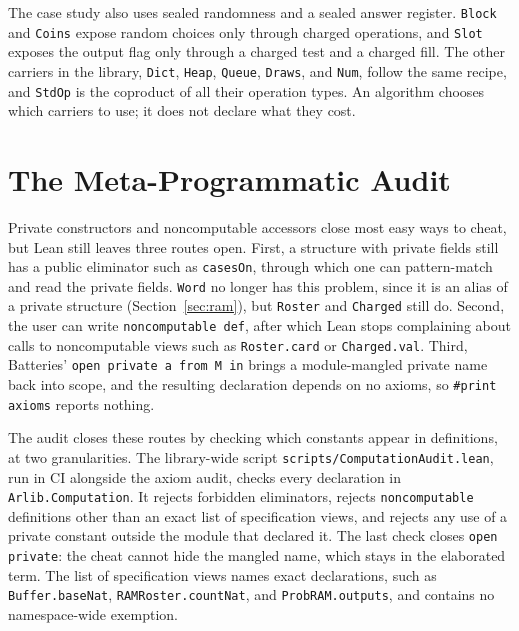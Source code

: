 \documentclass[acmsmall,nonacm]{acmart}
\begin{document}
The case study also uses sealed randomness and a sealed answer register.
\lstinline{Block} and \lstinline{Coins} expose random choices only through charged operations, and \lstinline{Slot} exposes the output flag only through a charged test and a charged fill.
The other carriers in the library, \lstinline{Dict}, \lstinline{Heap}, \lstinline{Queue}, \lstinline{Draws}, and \lstinline{Num}, follow the same recipe, and \lstinline{StdOp} is the coproduct of all their operation types.
An algorithm chooses which carriers to use; it does not declare what they cost.


\section{The Meta-Programmatic Audit}\label{sec:audit}

Private constructors and noncomputable accessors close most easy ways to cheat, but Lean still leaves three routes open.
First, a structure with private fields still has a public eliminator such as \lstinline{casesOn}, through which one can pattern-match and read the private fields.
\lstinline{Word} no longer has this problem, since it is an alias of a private structure (Section~\ref{sec:ram}), but \lstinline{Roster} and \lstinline{Charged} still do.
Second, the user can write \lstinline{noncomputable def}, after which Lean stops complaining about calls to noncomputable views such as \lstinline{Roster.card} or \lstinline{Charged.val}.
Third, Batteries' \lstinline{open private a from M in} brings a module-mangled private name back into scope, and the resulting declaration depends on no axioms, so \lstinline{#print axioms} reports nothing.

The audit closes these routes by checking which constants appear in definitions, at two granularities.
The library-wide script \lstinline{scripts/ComputationAudit.lean}, run in CI alongside the axiom audit, checks every declaration in \lstinline{Arlib.Computation}.
It rejects forbidden eliminators, rejects \lstinline{noncomputable} definitions other than an exact list of specification views, and rejects any use of a private constant outside the module that declared it.
The last check closes \lstinline{open private}: the cheat cannot hide the mangled name, which stays in the elaborated term.
The list of specification views names exact declarations, such as \lstinline{Buffer.baseNat}, \lstinline{RAMRoster.countNat}, and \lstinline{ProbRAM.outputs}, and contains no namespace-wide exemption.
\end{document}
